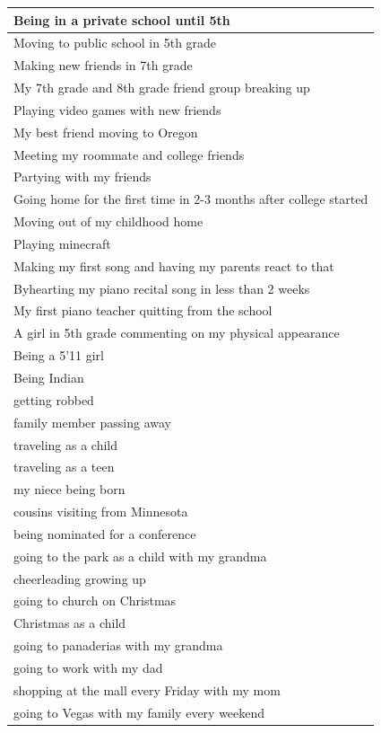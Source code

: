 \documentclass[
  .7em,
  letterpaper,
  DIV=11,
  numbers=noendperiod]{scrartcl}
\begin{document}
\begin{table}
\begin{tabular}{l}
\hline
Being in a private school until 5th\\
\hline
Moving to public school in 5th grade\\
\hline
Making new friends in 7th grade\\
\hline
My 7th grade and 8th grade friend group breaking up\\
\hline
Playing video games with new friends\\
\hline
My best friend moving to Oregon\\
\hline
Meeting my roommate and college friends\\
\hline
Partying with my friends\\
\hline
Going home for the first time in 2-3 months after college started\\
\hline
Moving out of my childhood home\\
\hline
Playing minecraft\\
\hline
Making my first song and having my parents react to that\\
\hline
Byhearting my piano recital song in less than 2 weeks\\
\hline
My first piano teacher quitting from the school\\
\hline
A girl in 5th grade commenting on my physical appearance\\
\hline
Being a 5'11 girl\\
\hline
Being Indian\\
\hline
getting robbed\\
\hline
family member passing away\\
\hline
traveling as a child\\
\hline
traveling as a teen\\
\hline
my niece being born\\
\hline
cousins visiting from Minnesota\\
\hline
being nominated for a conference\\
\hline
going to the park as a child with my grandma\\
\hline
cheerleading growing up\\
\hline
going to church on Christmas\\
\hline
Christmas as a child\\
\hline
going to panaderias with my grandma\\
\hline
going to work with my dad\\
\hline
shopping at the mall every Friday with my mom\\
\hline
going to Vegas with my family every weekend\\

\end{tabular}
\end{table}
\end{document}

